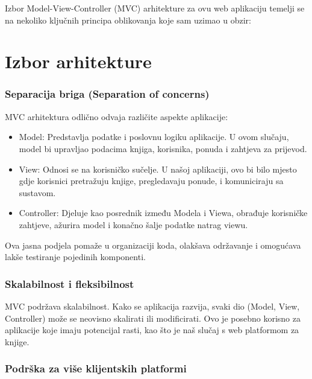 Izbor Model-View-Controller (MVC) arhitekture za ovu web aplikaciju temelji se na nekoliko ključnih principa oblikovanja koje sam uzimao u obzir:

	\eject
	
	\section{Izbor arhitekture}

 	\subsubsection{Separacija briga (Separation of concerns)}

MVC arhitektura odlično odvaja različite aspekte aplikacije:
\begin{itemize}
		  \item {Model: Predstavlja podatke i poslovnu logiku aplikacije. U ovom slučaju, model bi upravljao podacima knjiga, korisnika, ponuda i zahtjeva za prijevod.}
		  \item {View: Odnosi se na korisničko sučelje. U našoj aplikaciji, ovo bi bilo mjesto gdje korisnici pretražuju knjige, pregledavaju ponude, i komuniciraju sa sustavom.}	
            \item {Controller: Djeluje kao posrednik između Modela i Viewa, obrađuje korisničke zahtjeve, ažurira model i konačno šalje podatke natrag viewu.}
	   \end{itemize}

Ova jasna podjela pomaže u organizaciji koda, olakšava održavanje i omogućava lakše testiranje pojedinih komponenti.
	\\

 \subsubsection{Skalabilnost i fleksibilnost}

MVC podržava skalabilnost. Kako se aplikacija razvija, svaki dio (Model, View, Controller) može se neovisno skalirati ili modificirati. Ovo je posebno korisno za aplikacije koje imaju potencijal rasti, kao što je naš slučaj s web platformom za knjige.
	\\

 \subsubsection{Podrška za više klijentskih platformi}

